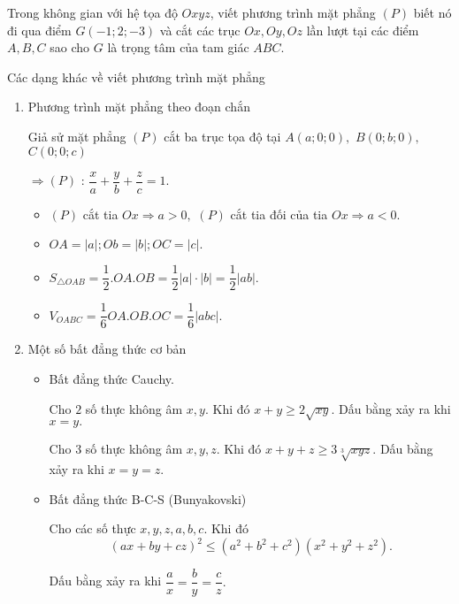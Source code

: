 \begin{bt}%
	Trong không gian với hệ tọa độ $Oxyz$, viết phương trình mặt phẳng $(P)$ biết nó đi qua điểm $G(-1;2;-3)$ và cắt các trục $Ox, Oy, Oz$ lần lượt tại các điểm $A, B, C$ sao cho $G$ là trọng tâm của tam giác $ABC$.
\end{bt}
\begin{dang}{Các dạng khác về viết phương trình mặt phẳng}
	\begin{enumerate}
		\item Phương trình mặt phẳng theo đoạn chắn
		
		Giả sử mặt phẳng $(P)$ cắt ba trục tọa độ tại $A(a;0;0),$  $ B(0;b;0),$  $ C(0;0;c)$ 
		
		$ \Rightarrow (P)$ : $\dfrac{x}{a}+\dfrac{y}{b}+\dfrac{z}{c}=1.$
		\begin{itemize}
			\item $(P)$ cắt tia $Ox\Rightarrow a>0,$ $ (P) $ cắt tia đối của tia $ Ox\Rightarrow a<0. $
			\item $OA=|a|; Ob=|b|; OC=|c|.$
			\item $S_{\triangle OAB}=\dfrac{1}{2}.OA.OB=\dfrac{1}{2}|a|\cdot|b|=\dfrac{1}{2}|ab|.$
			\item $V_{OABC}=\dfrac{1}{6}OA.OB.OC=\dfrac{1}{6}|abc|.$
		\end{itemize}
		\item Một số bất đẳng thức cơ bản
		\begin{itemize}
			\item Bất đẳng thức Cauchy.
			
			Cho $ 2 $ số thực không âm $ x, y. $ Khi đó $ x+y\ge 2\sqrt{xy}$. Dấu bằng xảy ra khi $ x=y. $
			
			Cho $ 3 $ số thực không âm $ x, y, z. $ Khi đó $ x+y+z\ge 3\sqrt[3]{xyz}$. Dấu bằng xảy ra khi $ x=y=z. $
			\item  Bất đẳng thức B-C-S (Bunyakovski)
			
			Cho các số thực $ x, y, z, a, b, c. $ Khi đó $$ \left(ax+by+cz\right)^2\le \left(a^2+b^2+c^2\right)\left(x^2+y^2+z^2\right). $$
			
			Dấu bằng xảy ra khi $ \dfrac{a}{x}=\dfrac{b}{y}=\dfrac{c}{z}. $
		\end{itemize}
	\end{enumerate}
	\end{dang}
